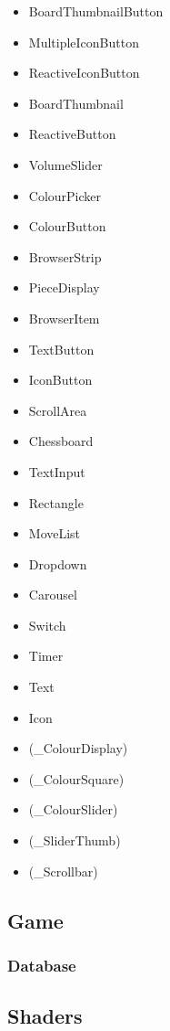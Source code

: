 \documentclass[../main/main.tex]{subfiles}
\begin{document}
\begin{multicols}{3}
\begin{itemize}
\item BoardThumbnailButton
\item MultipleIconButton
\item ReactiveIconButton
\item BoardThumbnail
\item ReactiveButton
\item VolumeSlider
\item ColourPicker
\item ColourButton
\item BrowserStrip
\item PieceDisplay
\item BrowserItem
\item TextButton
\item IconButton
\item ScrollArea
\item Chessboard
\item TextInput
\item Rectangle
\item MoveList
\item Dropdown
\item Carousel
\item Switch
\item Timer
\item Text
\item Icon
\item (\_ColourDisplay)
\item (\_ColourSquare)
\item (\_ColourSlider)
\item (\_SliderThumb)
\item (\_Scrollbar)
\end{itemize}
\end{multicols}

\subsection{Game}
\subsubsection{Database}

\subsection{Shaders}
\end{document}
